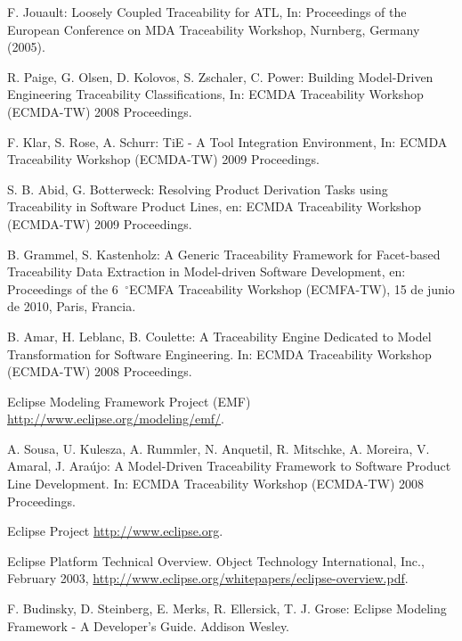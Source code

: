 \documentclass[a4paper,12pt,oneside]{book}
\newcommand{\grad}{\hspace{-2mm}$\phantom{a}^{\circ}$}
\begin{document}
\begin{thebibliography}{99}
 F. Jouault: Loosely Coupled Traceability for ATL, In: Proceedings of the European Conference on MDA Traceability Workshop, Nurnberg, Germany (2005).

 R. Paige, G. Olsen, D. Kolovos, S. Zschaler, C. Power: Building Model-Driven Engineering Traceability Classifications, In: ECMDA Traceability Workshop (ECMDA-TW) 2008 Proceedings.

 F. Klar, S. Rose, A. Schurr: TiE - A Tool Integration Environment,  In: ECMDA Traceability Workshop (ECMDA-TW) 2009 Proceedings.

 S. B. Abid, G. Botterweck: Resolving Product Derivation Tasks using Traceability in Software Product Lines, en: ECMDA Traceability Workshop (ECMDA-TW) 2009 Proceedings.

 B. Grammel, S. Kastenholz: A Generic Traceability Framework for Facet-based Traceability Data Extraction in Model-driven Software Development, en: Proceedings of the 6\grad ECMFA Traceability Workshop (ECMFA-TW), 15 de junio de 2010, Paris, Francia.

 B. Amar, H. Leblanc, B. Coulette: A Traceability Engine Dedicated to Model Transformation for Software Engineering. In: ECMDA Traceability Workshop (ECMDA-TW) 2008 Proceedings.

 Eclipse Modeling Framework Project (EMF) \url{http://www.eclipse.org/modeling/emf/}.

 A. Sousa, U. Kulesza, A. Rummler, N. Anquetil, R. Mitschke, A. Moreira, V. Amaral, J. Araújo: A Model-Driven Traceability Framework to Software Product Line Development. In: ECMDA Traceability Workshop (ECMDA-TW) 2008 Proceedings.

 Eclipse Project \url{http://www.eclipse.org}.

 Eclipse Platform Technical Overview. Object Technology International, Inc., February 2003,
\url{http://www.eclipse.org/whitepapers/eclipse-overview.pdf}.

 F. Budinsky, D. Steinberg, E. Merks, R. Ellersick, T. J. Grose: Eclipse Modeling Framework - A Developer's Guide. Addison Wesley.

\end{thebibliography}
\end{document}
